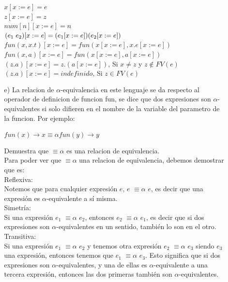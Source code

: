 \documentclass{article}
\begin{document}
\begin{itemize}
\begin{itemize}
                $x[x := e] = e$\\
                $z[x := e] = z$\\
                $num[n][x := e] = n$\\
                $(e_1\hspace{0.1cm}e_2)[x := e] = (e_1[x := e]) (e_2[x := e])$\\
                $fun(x, x.t)[x := e] = fun(x[x := e], x.e[x := e])$\\
                $fun(x, a)[x := e] = fun(x[x := e], a[x := e])$\\
                $(z.a)[x := e] = z.(a[x := e])$, Si $x \neq z$ y $z \notin FV(e)$\\
                $(z.a)[x := e] = indefinido$, Si $z \in FV(e)$\\
                \item[e)] La relacion de $\alpha$-equivalencia en este lenguaje se da respecto al operador de definicion de funcion fun, se dice que dos expresiones son $\alpha$-equivalentes si solo difieren en el nombre de la variable del parametro de la funcion. Por ejemplo:
                \begin{center}
                    $fun (x) \rightarrow x \equiv\alpha fun (y) \rightarrow y$
                \end{center}
        Demuestra que $\equiv\alpha$ es una relacion de equivalencia.\\

        Para poder ver que $\equiv\alpha$ una relacion de equivalencia, debemos demostrar que es:\\

        Reflexiva:\\
        Notemos que para cualquier expresión $e$, $e$ $\equiv\alpha$ $e$, es decir que una expresión es $\alpha$-equivalente a sí misma.\\

        Simetría:\\
        Si una expresión $e_1$ $\equiv\alpha$ $e_2$, entonces $e_2$ $\equiv\alpha$ $e_1$, es decir que si dos expresiones son $\alpha$-equivalentes en un sentido, también lo son en el otro.\\

        Transitiva:\\
        Si una expresión $e_1$ $\equiv\alpha$ $e_2$ y tenemos otra expresión $e_2$ $\equiv\alpha$ $e_3$ siendo $e_3$ una expresión, entonces tenemos que $e_1$ $\equiv\alpha$ $e_3$. Esto significa que si dos expresiones son $\alpha$-equivalentes, y una de ellas es $\alpha$-equivalente a una tercera expresión, entonces las dos primeras también son $\alpha$-equivalentes.\\


\end{itemize}
\end{itemize}
\end{document}
